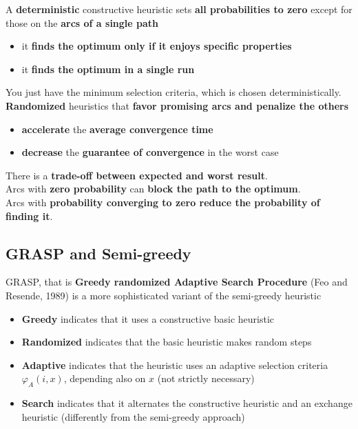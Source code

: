 \documentclass[11pt]{article}
\begin{document}
	\nn
	
	A \textbf{deterministic} constructive heuristic sets \textbf{all probabilities to zero} except for those on the \textbf{arcs of a single path}
	\begin{itemize}
		\item it \textbf{finds the optimum only if it enjoys specific properties}
		\item it \textbf{finds the optimum in a single run}
	\end{itemize} 
	You just have the minimum selection criteria, which is chosen deterministically.\\

	
	\textbf{Randomized} heuristics that \textbf{favor promising arcs and penalize the others}
	\begin{itemize}
		\item \textbf{accelerate} the \textbf{average convergence time}
		\item \textbf{decrease} the \textbf{guarantee of convergence} in the worst case
	\end{itemize}
	
	There is a \textbf{trade-off between expected and worst result}.\\
	
	Arcs with \textbf{zero probability} can \textbf{block the path to the optimum}.\\
	Arcs with \textbf{probability converging to zero reduce the probability of finding it}.\\
	
	\newpage
	
	\subsection{GRASP and Semi-greedy}
	GRASP, that is \textbf{Greedy randomized Adaptive Search Procedure} (Feo and Resende, 1989) is a more sophisticated variant of the semi-greedy heuristic
	\begin{itemize}
		\item \textbf{Greedy} indicates that it uses a constructive basic heuristic
		
		\item \textbf{Randomized} indicates that the basic heuristic makes random steps
		
		\item \textbf{Adaptive} indicates that the heuristic uses an adaptive selection criteria $\varphi_A (i, x)$, depending also on $x$ (not strictly necessary)
		
		\item \textbf{Search} indicates that it alternates the constructive heuristic and an exchange heuristic (differently from the semi-greedy approach)
	\end{itemize}
	
\end{document}

